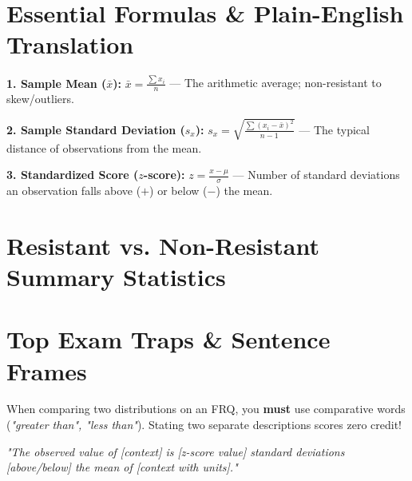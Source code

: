 \documentclass[11pt,oneside,openany]{book}
\begin{document}
\section{Essential Formulas \& Plain-English Translation}
\begin{formulabox}
\textbf{1. Sample Mean ($\bar{x}$):} $\bar{x} = \frac{\sum x_i}{n}$ --- The arithmetic average; non-resistant to skew/outliers.

\textbf{2. Sample Standard Deviation ($s_x$):} $s_x = \sqrt{\frac{\sum (x_i - \bar{x})^2}{n-1}}$ --- The typical distance of observations from the mean.

\textbf{3. Standardized Score ($z$-score):} $z = \frac{x - \mu}{\sigma}$ --- Number of standard deviations an observation falls above ($+$) or below ($-$) the mean.
\end{formulabox}

\section{Resistant vs. Non-Resistant Summary Statistics}
\begin{table}[H]
\centering
{}
\end{table}

\section{Top Exam Traps \& Sentence Frames}
\begin{trapbox}
When comparing two distributions on an FRQ, you \textbf{must} use comparative words (\emph{"greater than", "less than"}). Stating two separate descriptions scores zero credit!
\end{trapbox}

\begin{templatebox}
\emph{"The observed value of [context] is [z-score value] standard deviations [above/below] the mean of [context with units]."}
\end{templatebox}
\end{document}
